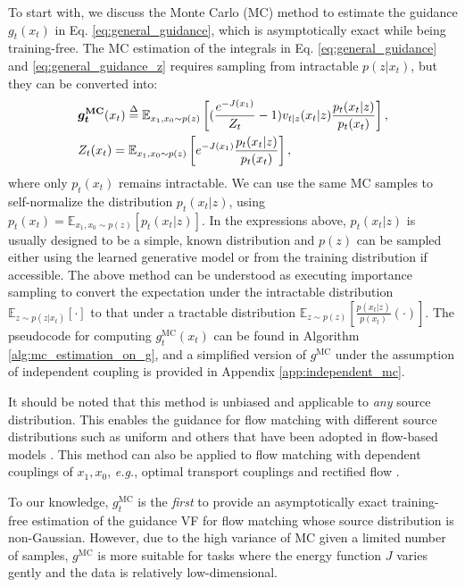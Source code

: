 To start with, we discuss the Monte Carlo (MC) method to estimate the guidance $g_t(x_t)$ in Eq. \eqref{eq:general_guidance}, which is asymptotically exact while being training-free. The MC estimation of the integrals in Eq. \eqref{eq:general_guidance} and \eqref{eq:general_guidance_z} requires sampling from intractable $p(z|x_t)$, but they can be converted into:
\begin{align}\nonumber
&    \bm{g_t}^{\textbf{MC}}(x_t) \overset{\Delta}{=} \mathbb{E}_{x_1,x_0\sim p(z)} 
\left[
(\frac{e^{-J(x_1)}}{Z_t} - 1) v_{t|z}(x_t|z) \frac{p_t(x_t|z)}{p_t(x_t)}
\right],
\\
&\nonumber    Z_t(x_t) = \mathbb{E}_{x_1,x_0\sim p(z)} 
\left[
e^{-J(x_1)} \frac{p_t(x_t|z)}{p_t(x_t)} 
\right],
\end{align}
where only $p_t(x_t)$ remains intractable. We can use the same MC samples to self-normalize the distribution $p_t(x_t|z)$, using $
    p_t(x_t) = \mathbb{E}_{x_1,x_0\sim p(z)}[p_t(x_t|z)]
$.
In the expressions above, $p_t(x_t|z)$ is usually designed to be a simple, known distribution \citep{tong_improving_2024} and $p(z)$ can be sampled either using the learned generative model or from the training distribution if accessible.
The above method can be understood as executing importance sampling to convert the expectation under the intractable distribution $\mathbb{E}_{z\sim p(z|x_t)}[\cdot]$ to that under a tractable distribution $\mathbb{E}_{z\sim p(z)}[\frac{p(x_t|z)}{p(x_t)}(\cdot)]$.
The pseudocode for computing $g^{\text{MC}}_t(x_t)$ can be found in Algorithm \ref{alg:mc_estimation_on_g}, and
a simplified version of $g^{\text{MC}}$ under the assumption of independent coupling is provided in Appendix \ref{app:independent_mc}.



It should be noted that this method is unbiased and applicable to \textit{any} source distribution.
This enables the guidance for flow matching with different source distributions such as uniform \citep{chen_flow_2024} and others that have been adopted in flow-based models \citep{papamakarios_masked_2018,mathieu_riemannian_2020,stimper_resampling_2022}. This method can also be applied to flow matching with dependent couplings of $x_1,x_0$, \textit{e.g.}, optimal transport couplings \citep{tong_improving_2024} and rectified flow \citep{liu_flow_2022}. 

To our knowledge, $g^{\text{MC}}_t$ is the \emph{first} to provide an asymptotically exact training-free estimation of the guidance VF for flow matching whose source distribution is non-Gaussian. However, due to the high variance of MC given a limited number of samples, $g^{\text{MC}}$ is more suitable for tasks where the energy function $J$ varies gently and the data is relatively low-dimensional.






